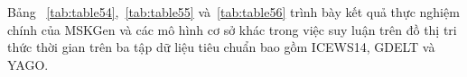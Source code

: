Bảng ~\ref{tab:table54},~\ref{tab:table55} và~\ref{tab:table56} trình bày kết quả thực nghiệm chính của MSKGen và 
các mô hình cơ sở khác trong việc suy luận trên đồ thị tri thức thời gian trên ba tập dữ liệu tiêu chuẩn bao gồm 
ICEWS14, GDELT và YAGO.

\begin{table}[H]
\caption{Kết quả thực nghiệm của MSKGen và các mô hình khác trên tập dữ liệu ICEWS14 với thiết lập bộ lọc nhận thức thời gian. 
Điểm số cao nhất được \textbf{bôi đen} và điểm số tốt thứ hai được \underline{gạch chân}.}
\label{tab:table54}
\begin{adjustbox}{width=\textwidth}

\end{adjustbox}
\end{table}
